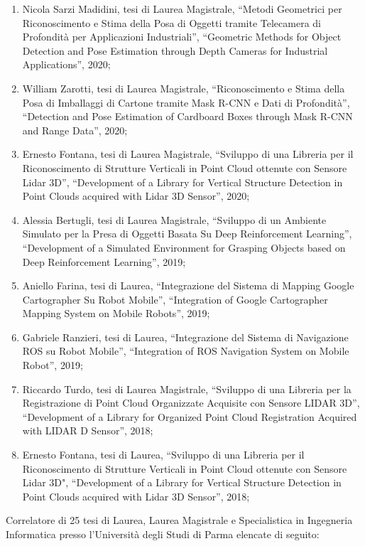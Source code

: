\documentclass[11pt]{article}
\begin{document}
\begin{itemize}
\begin{enumerate}
\item Nicola Sarzi Madidini, tesi di Laurea Magistrale, ``Metodi Geometrici per Riconoscimento e Stima della Posa di Oggetti tramite Telecamera di Profondità per Applicazioni Industriali'', 
   ``Geometric Methods for Object Detection and Pose Estimation through Depth Cameras for Industrial Applications'', 2020;
\item William Zarotti, tesi di Laurea Magistrale, ``Riconoscimento e Stima della Posa di Imballaggi di Cartone tramite Mask R-CNN e Dati di Profondità'', 
   ``Detection and Pose Estimation of Cardboard Boxes through Mask R-CNN and Range Data'', 2020;
\item Ernesto Fontana, tesi di Laurea Magistrale, ``Sviluppo di una Libreria per il Riconoscimento di Strutture Verticali in Point Cloud ottenute con Sensore Lidar 3D'', 
   ``Development of a Library for Vertical Structure Detection in Point Clouds acquired with Lidar 3D Sensor'', 2020;
\item Alessia Bertugli, tesi di Laurea Magistrale, ``Sviluppo di un Ambiente Simulato per la Presa di Oggetti Basata Su Deep Reinforcement Learning'', 
   ``Development of a Simulated Environment for Grasping Objects based on Deep Reinforcement Learning'', 2019;
\item Aniello Farina, tesi di Laurea, ``Integrazione del Sistema di Mapping Google Cartographer Su Robot Mobile'', 
  ``Integration of Google Cartographer Mapping System on Mobile Robots'', 2019;
\item Gabriele Ranzieri, tesi di Laurea, ``Integrazione del Sistema di Navigazione ROS su Robot Mobile'', ``Integration of ROS Navigation System on Mobile Robot'', 2019;
\item Riccardo Turdo, tesi di Laurea Magistrale, ``Sviluppo di una Libreria per la Registrazione di Point Cloud Organizzate Acquisite con Sensore LIDAR 3D'',
  ``Development of a Library for Organized Point Cloud Registration Acquired with LIDAR D Sensor'', 2018;
\item Ernesto Fontana, tesi di Laurea, ``Sviluppo di una Libreria per il Riconoscimento di Strutture Verticali in Point Cloud ottenute con Sensore Lidar 3D", 
   ``Development of a Library for Vertical Structure Detection in Point Clouds acquired with Lidar 3D Sensor'', 2018;
\end{enumerate}
%
\vspace{3mm}
%
Correlatore di 25 tesi di Laurea, Laurea Magistrale e Specialistica in Ingegneria Informatica presso l'Universit\`a degli Studi di Parma elencate di seguito: 

\end{itemize}
\end{document}
